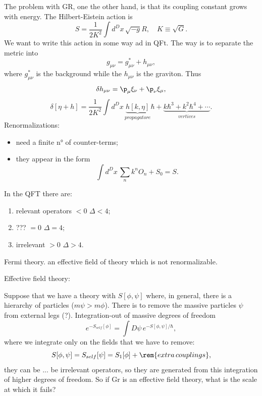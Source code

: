 The problem with GR, one the other hand, is that its coupling constant grows with energy. The Hilbert-Eistein action is
\begin{equation}
    S = \frac{1}{2K^2}\int d^Dx\,\sqrt{-g}R,\quad K \equiv \sqrt{G}.
\end{equation}
We want to write this action in some way ad in QFt. The way is to separate the metric into 
\begin{equation}
    g_{\mu\nu} = g_{\mu\nu}^* + h_{\mu\nu},
\end{equation}
where $g_{\mu\nu}^*$ is the background while the $h_{\mu\nu}$ is the graviton. Thus
\begin{equation}
    \delta h_{\mu\nu} = \p_\mu\xi_\nu + \p_\nu\xi_\mu,
\end{equation}
\begin{equation}
    \delta[\eta + h]  =\frac{1}{2K^2}\int d^Dx\,\underbrace{h[k,\eta]}_{propagatore} \hbar + \underbrace{k\hbar^3 + k^2\hbar^4 + \cdots}_{vertices}.
\end{equation}
Renormalizations:
\begin{itemize}
    \item need a finite n° of counter-terms;
    \item they appear in the form 
    \begin{equation}
        \int d^Dx\,\sum_nk^nO_n + S_0 = S.
    \end{equation}
\end{itemize}
In the QFT there are:
\begin{enumerate}
    \item relevant operators $< 0$ $\Delta < 4$;
    \item ??? $= 0$ $\Delta = 4$;
    \item irrelevant $> 0$ $\Delta > 4$.
\end{enumerate}
Fermi theory. an effective field of theory which is not renormalizable. 

Effective field theory: 

Suppose that we have a theory with $S[\phi,\psi]$ where, in general, there is a hierarchy of particles ($m\psi > m\phi$). There is to remove the massive particles $\psi$ from external legs (?). Integration-out of massive degrees of freedom
\begin{equation}
    e^{-S_{self}[\phi]} = \int D\psi\,e^{-S[\phi,\psi]/\hbar},
\end{equation}
where we integrate only on the fields that we have to remove:
\begin{equation}
    S[\phi,\psi] = S_{self}[\psi] = S_1[\phi] + \rem{extra\,couplings},
\end{equation}
they can be ... be irrelevant operators, so they are generated from this integration of higher degrees of freedom. So if Gr is an effective field theory, what is the scale at which it fails?

